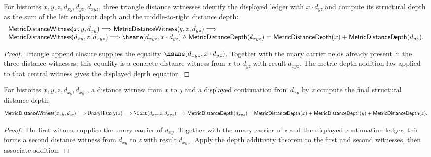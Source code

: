 \begin{theorem}
\label{thm:metric-distance-witness-triangle-append-depth-add}
For histories $x,y,z,d_{xy},d_{yz},d_{xyz}$, three triangle distance witnesses
identify the displayed ledger with $x\cdot d_{yz}$ and compute its structural
depth as the sum of the left endpoint depth and the middle-to-right distance
depth:
$$
\begin{array}{l}
\mathsf{MetricDistanceWitness}(x,y,d_{xy})\Longrightarrow
\mathsf{MetricDistanceWitness}(y,z,d_{yz})\Longrightarrow
\\
\mathsf{MetricDistanceWitness}(d_{xy},z,d_{xyz})\Longrightarrow
\hsame(d_{xyz},x\cdot d_{yz})\land
\mathsf{MetricDistanceDepth}(d_{xyz})=
\mathsf{MetricDistanceDepth}(x)+\mathsf{MetricDistanceDepth}(d_{yz}).
\end{array}
$$
\end{theorem}
\begin{proof}
Triangle append closure supplies the equality
$\hsame(d_{xyz},x\cdot d_{yz})$. Together with the unary carrier fields
already present in the three distance witnesses, this equality is a concrete
distance witness from $x$ to $d_{yz}$ with result $d_{xyz}$. The metric depth
addition law applied to that central witness gives the displayed depth
equation.
\end{proof}

\begin{theorem}
\label{thm:metric-distance-witness-cont-depth-add}
For histories $x,y,z,d_{xy},d_{xyz}$, a distance witness from $x$ to $y$ and a
displayed continuation from $d_{xy}$ by $z$ compute the final structural
distance depth:
$$
\mathsf{MetricDistanceWitness}(x,y,d_{xy})\Longrightarrow
\mathsf{UnaryHistory}(z)\Longrightarrow
\Cont(d_{xy},z,d_{xyz})\Longrightarrow
\mathsf{MetricDistanceDepth}(d_{xyz})
=
\mathsf{MetricDistanceDepth}(x)+\mathsf{MetricDistanceDepth}(y)
+\mathsf{MetricDistanceDepth}(z).
$$
\end{theorem}
\begin{proof}
The first witness supplies the unary carrier of $d_{xy}$. Together with the
unary carrier of $z$ and the displayed continuation ledger, this forms a second
distance witness from $d_{xy}$ to $z$ with result $d_{xyz}$. Apply the depth
additivity theorem to the first and second witnesses, then associate addition.
\end{proof}

